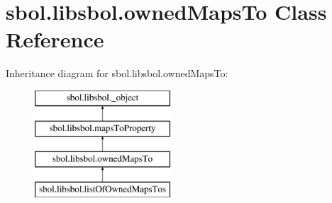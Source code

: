 \hypertarget{classsbol_1_1libsbol_1_1owned_maps_to}{}\section{sbol.\+libsbol.\+owned\+Maps\+To Class Reference}
\label{classsbol_1_1libsbol_1_1owned_maps_to}
Inheritance diagram for sbol.\+libsbol.\+owned\+Maps\+To\+:\begin{figure}[H]
\begin{center}
\leavevmode
\includegraphics[height=4.000000cm]{classsbol_1_1libsbol_1_1owned_maps_to}
\end{center}
\end{figure}
